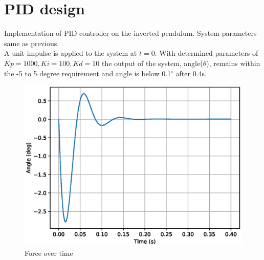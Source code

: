 \section{PID design}%
\label{closedloopyy}

Implementation of PID controller on the inverted pendulum. System parameters same as previous. \\
A unit impulse is applied to the system at $t = 0$. With determined parameters of $Kp = 1000, Ki = 100, Kd=10$ the output of the system, angle($\theta$), remains within the -5 to 5 degree requirement and angle is below 0.1$^\circ$ after 0.4s.

\begin{figure}[H]
	\centering
	\captionsetup{justification=centering}
	\includegraphics[width=0.8\linewidth]{imgs/q5_theta_t.eps}
	\caption{Force over time}%
	\label{fig:14}
\end{figure}
